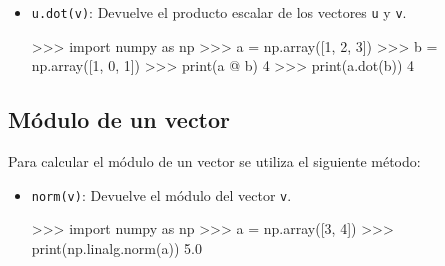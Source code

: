 \documentclass[
  spanish,
  a4paper,
]{scrreport}
\newenvironment{Shaded}{\begin{snugshade}}{\end{snugshade}}
\newcommand{\BuiltInTok}[1]{\textcolor[rgb]{0.00,0.23,0.31}{#1}}
\newcommand{\DecValTok}[1]{\textcolor[rgb]{0.68,0.00,0.00}{#1}}
\newcommand{\FloatTok}[1]{\textcolor[rgb]{0.68,0.00,0.00}{#1}}
\newcommand{\ImportTok}[1]{\textcolor[rgb]{0.00,0.46,0.62}{#1}}
\newcommand{\NormalTok}[1]{\textcolor[rgb]{0.00,0.23,0.31}{#1}}
\newcommand{\OperatorTok}[1]{\textcolor[rgb]{0.37,0.37,0.37}{#1}}
\begin{document}
\begin{itemize}
\item
  \texttt{u.dot(v)}: Devuelve el producto escalar de los vectores
  \texttt{u} y \texttt{v}.

\begin{Shaded}
\begin{Highlighting}[]
\OperatorTok{\textgreater{}\textgreater{}\textgreater{}} \ImportTok{import}\NormalTok{ numpy }\ImportTok{as}\NormalTok{ np}
\OperatorTok{\textgreater{}\textgreater{}\textgreater{}}\NormalTok{ a }\OperatorTok{=}\NormalTok{ np.array([}\DecValTok{1}\NormalTok{, }\DecValTok{2}\NormalTok{, }\DecValTok{3}\NormalTok{])}
\OperatorTok{\textgreater{}\textgreater{}\textgreater{}}\NormalTok{ b }\OperatorTok{=}\NormalTok{ np.array([}\DecValTok{1}\NormalTok{, }\DecValTok{0}\NormalTok{, }\DecValTok{1}\NormalTok{])}
\OperatorTok{\textgreater{}\textgreater{}\textgreater{}} \BuiltInTok{print}\NormalTok{(a }\OperatorTok{@}\NormalTok{ b)}
\DecValTok{4}
\OperatorTok{\textgreater{}\textgreater{}\textgreater{}} \BuiltInTok{print}\NormalTok{(a.dot(b))}
\DecValTok{4}
\end{Highlighting}
\end{Shaded}
\end{itemize}

\subsection{Módulo de un vector}\label{muxf3dulo-de-un-vector}

Para calcular el módulo de un vector se utiliza el siguiente método:

\begin{itemize}
\item
  \texttt{norm(v)}: Devuelve el módulo del vector \texttt{v}.

\begin{Shaded}
\begin{Highlighting}[]
\OperatorTok{\textgreater{}\textgreater{}\textgreater{}} \ImportTok{import}\NormalTok{ numpy }\ImportTok{as}\NormalTok{ np}
\OperatorTok{\textgreater{}\textgreater{}\textgreater{}}\NormalTok{ a }\OperatorTok{=}\NormalTok{ np.array([}\DecValTok{3}\NormalTok{, }\DecValTok{4}\NormalTok{])}
\OperatorTok{\textgreater{}\textgreater{}\textgreater{}} \BuiltInTok{print}\NormalTok{(np.linalg.norm(a))}
\FloatTok{5.0}
\end{Highlighting}
\end{Shaded}
\end{itemize}
\end{document}
